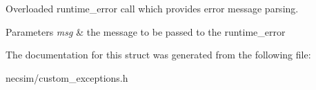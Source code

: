 Overloaded runtime\+\_\+error call which provides error message parsing. 


\begin{DoxyParams}{Parameters}
{\em msg} & the message to be passed to the runtime\+\_\+error \\
\hline
\end{DoxyParams}


The documentation for this struct was generated from the following file\+:\begin{DoxyCompactItemize}
\item 
necsim/custom\+\_\+exceptions.\+h\end{DoxyCompactItemize}
